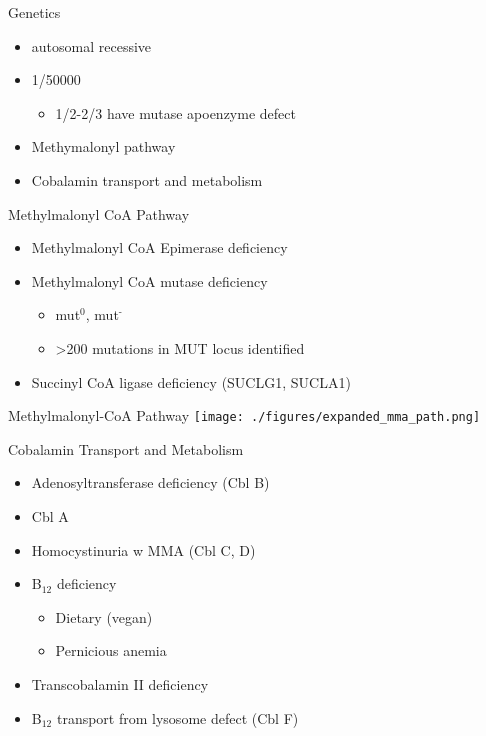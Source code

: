 \documentclass[presentation, smaller]{beamer}
\begin{document}
\begin{frame}[label={sec:orgheadline3}]{Genetics}
\begin{itemize}
\item autosomal recessive
\item 1/50000
\begin{itemize}
\item 1/2-2/3 have mutase apoenzyme defect
\end{itemize}
\item Methymalonyl pathway
\item Cobalamin transport and metabolism
\end{itemize}
\end{frame}

\begin{frame}[label={sec:orgheadline4}]{Methylmalonyl CoA Pathway}
\begin{itemize}
\item Methylmalonyl CoA Epimerase deficiency
\item Methylmalonyl CoA mutase deficiency
\begin{itemize}
\item mut\(^{\text{0}}\), mut\(^{\text{-}}\)
\item >200 mutations in MUT locus identified
\end{itemize}
\item Succinyl CoA ligase deficiency (SUCLG1, SUCLA1)
\end{itemize}
\end{frame}

\begin{frame}[label={sec:orgheadline5}]{Methylmalonyl-CoA  Pathway}
\centering
\texttt{[image: ./figures/expanded\_mma\_path.png]}
\end{frame}

\begin{frame}[label={sec:orgheadline6}]{Cobalamin Transport and Metabolism}
\begin{itemize}
\item Adenosyltransferase deficiency (Cbl B)
\item Cbl A
\item Homocystinuria w MMA (Cbl C, D)
\item B\(_{\text{12}}\) deficiency
\begin{itemize}
\item Dietary (vegan)
\item Pernicious anemia
\end{itemize}
\item Transcobalamin II deficiency
\item B\(_{\text{12}}\) transport from lysosome defect (Cbl F)
\end{itemize}
\end{frame}
\end{document}

